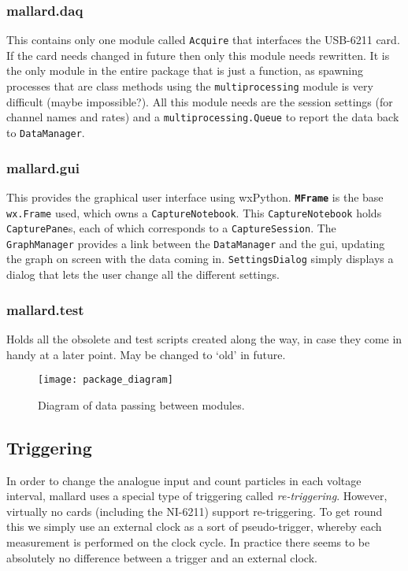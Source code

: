\documentclass[10pt,a4paper]{article}
\begin{document}
\subsubsection{mallard.daq} 
This contains only one module called \texttt{Acquire} that interfaces the USB-6211 card. If the card needs changed in future then only this module needs rewritten. It is the only module in the entire package that is just a function, as spawning processes that are class methods using the \texttt{multiprocessing} module is very difficult (maybe impossible?). All this module needs are the session settings (for channel names and rates) and a \texttt{multiprocessing.Queue} to report the data back to \texttt{DataManager}.
\subsubsection{mallard.gui} 
This provides the graphical user interface using wxPython. \textbf{\texttt{MFrame}} is the base \texttt{wx.Frame} used, which owns a \texttt{CaptureNotebook}. This \texttt{CaptureNotebook} holds \texttt{CapturePane}s, each of which corresponds to a \texttt{CaptureSession}. The \texttt{GraphManager} provides a link between the \texttt{DataManager} and the gui, updating the graph on screen with the data coming in. \texttt{SettingsDialog} simply displays a dialog that lets the user change all the different settings.

\subsubsection{mallard.test} 
Holds all the obsolete and test scripts created along the way, in case they come in handy at a later point. May be changed to `old' in future. 

\begin{figure}[h!]

  \centering
    \texttt{[image: package\_diagram]}
      \caption{Diagram of data passing between modules.}
\end{figure}

\subsection{Triggering}
In order to change the analogue input and count particles in each voltage interval, mallard uses a special type of triggering called \textit{re-triggering}. However, virtually no cards (including the NI-6211) support re-triggering. To get round this we simply use an external clock as a sort of pseudo-trigger, whereby each measurement is performed on the clock cycle. In practice there seems to be absolutely no difference between a trigger and an external clock. 
\end{document}
